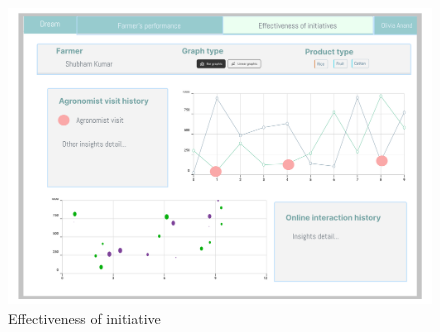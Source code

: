 \begin{figure}[H]
	\centering
    \includegraphics[page=1, width=\textwidth]{Images/UI/effective-initiative.pdf}

	\caption{\label{fig:FE_image5}Effectiveness of initiative}

\end{figure}